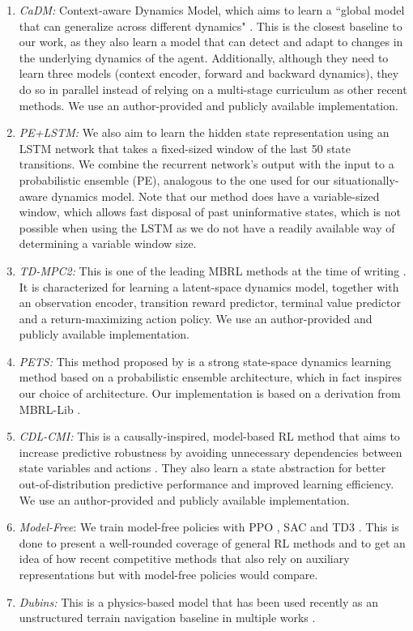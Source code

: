\documentclass[Afour,sageh,times]{sagej}
\theoremstyle{lemma}
\begin{document}
\begin{enumerate} 
    \item \textit{CaDM:} Context-aware Dynamics Model, which aims to learn a ``global model that can generalize across different dynamics" \cite[]{lee2020context}. This is the closest baseline to our work, as they also learn a model that can detect and adapt to changes in the underlying dynamics of the agent. Additionally, although they need to learn three models (context encoder, forward and backward dynamics), they do so in parallel instead of relying on a multi-stage curriculum as other recent methods. We use an author-provided and publicly available implementation.
    \item \textit{PE+LSTM:} We also aim to learn the hidden state representation using an LSTM network that takes a fixed-sized window of the last 50 state transitions. We combine the recurrent network's output with the input to a probabilistic ensemble (PE), analogous to the one used for our situationally-aware dynamics model. Note that our method does have a variable-sized window, which allows fast disposal of past uninformative states, which is not possible when using the LSTM as we do not have a readily available way of determining a variable window size.
    \item \textit{TD-MPC2:} This is one of the leading MBRL methods at the time of writing \cite[]{hansen2023td}. It is characterized for learning a latent-space dynamics model, together with an observation encoder, transition reward predictor, terminal value predictor and a return-maximizing action policy. We use an author-provided and publicly available implementation.
    \item \textit{PETS:} This method proposed by \cite{chua2018deep} is a strong state-space dynamics learning method based on a probabilistic ensemble architecture, which in fact inspires our choice of architecture. Our implementation is based on a derivation from MBRL-Lib \cite[]{Pineda2021MBRL}.
    \item \textit{CDL-CMI:} This is a causally-inspired, model-based RL method that aims to increase predictive robustness by avoiding unnecessary dependencies between state variables and actions \cite[]{wang2022causal}. They also learn a state abstraction for better out-of-distribution predictive performance and improved learning efficiency. We use an author-provided and publicly available implementation.
    \item \textit{Model-Free}: We train model-free policies with PPO \cite[]{schulman2017proximal}, SAC \cite[]{haarnoja2018soft} and TD3 \cite[]{fujimoto2018addressing}. This is done to present a well-rounded coverage of general RL methods and to get an idea of how recent competitive methods that also rely on auxiliary representations but with model-free policies would compare. 
    \item \textit{Dubins:} This is a physics-based model \cite[]{dubins-dyns} that has been used recently as an unstructured terrain navigation baseline in multiple works \cite[]{siva2024self, yu2024adaptive}.
\end{enumerate}
\end{document}
